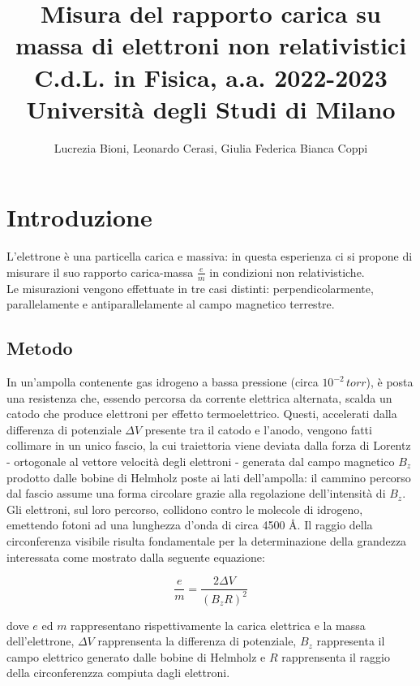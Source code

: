 \documentclass[]{article}
\title{%
    \Huge Misura del rapporto carica su massa di elettroni non relativistici \\
    \Large C.d.L. in Fisica, a.a. 2022-2023 \\ Università degli Studi di Milano}
\author{\LARGE Lucrezia Bioni, Leonardo Cerasi, Giulia Federica Bianca Coppi}
\date{}
\let\oldsection\section%
\renewcommand{\section}{%
	\renewcommand{\theequation}{\thesection.\arabic{equation}}%
	\oldsection}%
\let\oldsubsection\subsection%
\renewcommand{\subsection}{%
	\renewcommand{\theequation}{\thesubsection.\arabic{equation}}%
	\oldsubsection}%
\begin{document}
    \maketitle

    \section{Introduzione}

    L'elettrone è una particella carica e massiva: in questa esperienza ci si propone di misurare il suo rapporto carica-massa $ \frac{e}{m} $ in condizioni non relativistiche. \\
    Le misurazioni vengono effettuate in tre casi distinti: perpendicolarmente, parallelamente e antiparallelamente al campo magnetico terrestre.


    \subsection{Metodo}

    In un'ampolla contenente gas idrogeno a bassa pressione (circa $ 10^{-2}\, torr $), è posta una resistenza che, essendo percorsa da corrente elettrica alternata, scalda un catodo che produce elettroni per effetto termoelettrico. 
    Questi, accelerati dalla differenza di potenziale $\Delta V$ presente tra il catodo e l'anodo, vengono fatti collimare in un unico fascio, la cui traiettoria viene deviata dalla forza di Lorentz - ortogonale al vettore velocità degli elettroni - generata dal campo magnetico $ B_z $ prodotto dalle bobine di Helmholz poste ai lati dell'ampolla: il cammino percorso dal fascio assume una forma circolare grazie alla regolazione dell'intensità di $B_z$. \\

    Gli elettroni, sul loro percorso, collidono contro le molecole di idrogeno, emettendo fotoni ad una lunghezza d'onda di circa 4500 Å.
    Il raggio della circonferenza visibile risulta fondamentale per la determinazione della grandezza interessata come mostrato dalla seguente equazione:

    \begin{equation}
        \label{e_m}
        \frac{e}{m} = \frac{2 \Delta V}{(B_z R)^2}
    \end{equation}

    dove $ e $ ed $ m $ rappresentano rispettivamente la carica elettrica e la massa dell'elettrone, $\Delta V$ rapprensenta la differenza di potenziale, $B_z$ rappresenta il campo elettrico generato dalle bobine di Helmholz e $ R $ rapprensenta il raggio della circonferenzza compiuta dagli elettroni. \\
\end{document}
